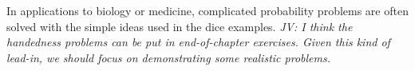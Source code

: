 In applications to biology or medicine, complicated probability problems are often solved with the simple ideas used in the dice examples. \textit{JV: I think the handedness problems can be put in end-of-chapter exercises. Given this kind of lead-in, we should focus on demonstrating some realistic problems.}

